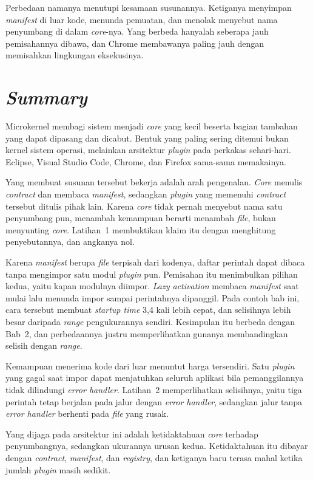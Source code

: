 Perbedaan namanya menutupi kesamaan susunannya. Ketiganya menyimpan \textit{manifest} di
luar kode, menunda pemuatan, dan menolak menyebut nama penyumbang di dalam
\textit{core}-nya. Yang berbeda hanyalah seberapa jauh pemisahannya dibawa, dan Chrome
membawanya paling jauh dengan memisahkan lingkungan eksekusinya.

\section{\textit{Summary}}

Microkernel membagi sistem menjadi \textit{core} yang kecil beserta bagian tambahan yang
dapat dipasang dan dicabut. Bentuk yang paling sering ditemui bukan kernel
sistem operasi, melainkan arsitektur \textit{plugin} pada perkakas sehari-hari.
Eclipse, Visual Studio Code, Chrome, dan Firefox sama-sama memakainya.

Yang membuat susunan tersebut bekerja adalah arah pengenalan. \textit{Core} menulis
\textit{contract} dan membaca \textit{manifest}, sedangkan \textit{plugin} yang
memenuhi \textit{contract} tersebut ditulis pihak lain. Karena \textit{core}
tidak pernah menyebut nama satu penyumbang pun, menambah kemampuan berarti
menambah \textit{file}, bukan menyunting \textit{core}. Latihan~1 membuktikan
klaim itu dengan menghitung penyebutannya, dan angkanya nol.

Karena \textit{manifest} berupa \textit{file} terpisah dari kodenya, daftar perintah
dapat dibaca tanpa mengimpor satu modul \textit{plugin} pun. Pemisahan itu
menimbulkan pilihan kedua, yaitu kapan modulnya diimpor. \textit{Lazy
activation} membaca \textit{manifest} saat mulai lalu menunda impor sampai
perintahnya dipanggil. Pada contoh bab ini, cara tersebut
membuat \textit{startup time} 3,4 kali lebih cepat, dan selisihnya lebih besar daripada
\textit{range} pengukurannya sendiri. Kesimpulan itu berbeda dengan Bab~2, dan
perbedaannya justru memperlihatkan gunanya membandingkan selisih dengan
\textit{range}.

Kemampuan menerima kode dari luar menuntut harga tersendiri. Satu
\textit{plugin} yang gagal saat impor dapat menjatuhkan seluruh aplikasi bila
pemanggilannya tidak dilindungi \textit{error handler}. Latihan~2 memperlihatkan
selisihnya, yaitu tiga perintah tetap berjalan pada jalur dengan \textit{error
handler}, sedangkan jalur tanpa \textit{error handler} berhenti pada
\textit{file} yang rusak.

Yang dijaga pada arsitektur ini adalah ketidaktahuan \textit{core} terhadap
penyumbangnya, sedangkan ukurannya urusan kedua. Ketidaktahuan itu dibayar dengan
\textit{contract}, \textit{manifest}, dan \textit{registry}, dan ketiganya baru terasa mahal ketika jumlah
\textit{plugin} masih sedikit.

